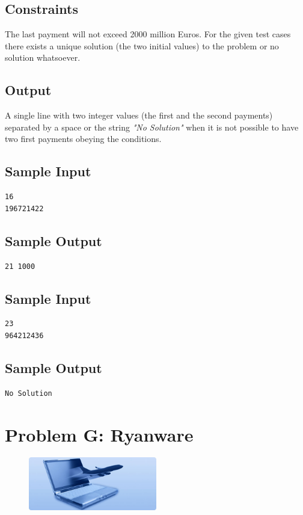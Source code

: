\documentclass[11pt]{report}
\begin{document}
\subsection*{Constraints}
The last payment will not exceed 2000 million Euros.
For the given test cases there exists a unique solution (the two initial values) to the problem or no solution whatsoever.

\subsection*{Output}
A single line with two integer values (the first and the second payments) separated by a space or the string \textit{"No Solution"} when it is not possible to have two first payments obeying the conditions.

\subsection*{Sample Input}
\begin{verbatim}
16
196721422
\end{verbatim}
\subsection*{Sample Output}
\begin{verbatim}
21 1000
\end{verbatim}
\subsection*{Sample Input}
\begin{verbatim}
23
964212436
\end{verbatim}
\subsection*{Sample Output}
\begin{verbatim}
No Solution
\end{verbatim}

\clearpage

\section*{Problem G: Ryanware}

\begin{figure}
  \centering
  \includegraphics[width=0.5\textwidth]{ryanware}
\end{figure}
\end{document}

